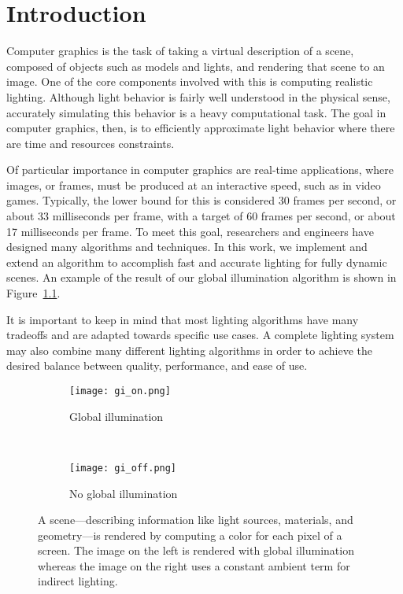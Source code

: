 \chapter{Introduction}
Computer graphics is the task of taking a virtual description of a scene, composed of objects such as models and lights, and rendering that scene to an image. One of the core components involved with this is computing realistic lighting. Although light behavior is fairly well understood in the physical sense, accurately simulating this behavior is a heavy computational task. The goal in computer graphics, then, is to efficiently approximate light behavior where there are time and resources constraints.


Of particular importance in computer graphics are real-time applications, where images, or frames, must be produced at an interactive speed, such as in video games. Typically, the lower bound for this is considered 30 frames per second, or about 33 milliseconds per frame, with a target of 60 frames per second, or about 17 milliseconds per frame. To meet this goal, researchers and engineers have designed many algorithms and techniques.
In this work, we implement and extend an algorithm to accomplish fast and accurate lighting for fully dynamic scenes. An example of the result of our global illumination algorithm is shown in Figure~\ref{fig:introduction_gi}.

It is important to keep in mind that most lighting algorithms have many tradeoffs and are adapted towards specific use cases. A complete lighting system may also combine many different lighting algorithms in order to achieve the desired balance between quality, performance, and ease of use.

\begin{figure}[h]
\centering
    \begin{subfigure}[t]{0.475\textwidth}
        \texttt{[image: gi\_on.png]}
        \caption{Global illumination}
    \end{subfigure}
    ~
    \begin{subfigure}[t]{0.475\textwidth}
        \texttt{[image: gi\_off.png]}
        \caption{No global illumination}
    \end{subfigure}
    \caption{A scene---describing information like light sources, materials, and geometry---is rendered by computing a color for each pixel of a screen. The image on the left is rendered with global illumination whereas the image on the right uses a constant ambient term for indirect lighting.}
    \label{fig:introduction_gi}
\end{figure}

